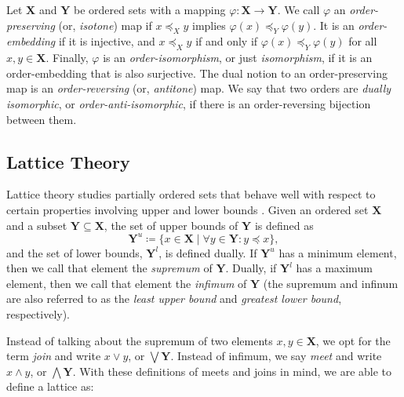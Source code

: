 \begin{definition}
	\label{definition:order-maps}    
	    

	Let $\mathbf{X}$ and $\mathbf{Y}$ be ordered sets with a mapping $\varphi : \mathbf{X}\to \mathbf{Y}$. We call $\varphi$
	an \textit{order-preserving} (or, \textit{isotone}) map if $x \preceq_{X}y$ implies $\varphi(x) \preceq_{Y}\varphi(y)$.
	It is an \textit{order-embedding} if it is injective, and $x \preceq_{X}y$ if and only if $\varphi(x) \preceq_{Y}\varphi
	(y)$ for all $x,y \in \mathbf{X}$. Finally, $\varphi$ is an \textit{order-isomorphism}, or just \textit{isomorphism}, if
	it is an order-embedding that is also surjective. The dual notion to an order-preserving map is an \textit{order-reversing}
	(or, \textit{antitone}) map. We say that two orders are \textit{dually isomorphic}, or \textit{order-anti-isomorphic},
	if there is an order-reversing bijection between them.
\end{definition}

\subsection{Lattice Theory}
\label{subsection:lattice-theory}

Lattice theory studies partially ordered sets that behave well with respect to certain properties involving upper and
lower bounds \cite{davey2002introduction}. Given an ordered set $\mathbf{X}$ and a subset $\mathbf{Y}\subseteq \mathbf{X}$,
the set of upper bounds of $\mathbf{Y}$ is defined as
\[
	\mathbf{Y}^{u}\coloneqq \{x \in \mathbf{X}\mid \forall y \in \mathbf{Y}: y \preceq x\},
\]
and the set of lower bounds, $\mathbf{Y}^{l}$, is defined dually. If $\mathbf{Y}^{u}$ has a minimum element, then we
call that element the \textit{supremum} of $\mathbf{Y}$. Dually, if $\mathbf{Y}^{l}$ has a maximum element, then we call
that element the \textit{infimum} of $\mathbf{Y}$ (the supremum and infinum are also referred to as the \textit{least
upper bound} and \textit{greatest lower bound}, respectively).

    Instead of talking about the supremum
of two elements $x,y \in \mathbf{X}$, we opt for the term \textit{join} and write $x \vee y$, or $\bigvee \mathbf{Y}$.
Instead of infimum, we say \textit{meet} and write $x \wedge y$, or $\bigwedge \mathbf{Y}$. With these definitions of
meets and joins in mind, we are able to define a lattice as:

